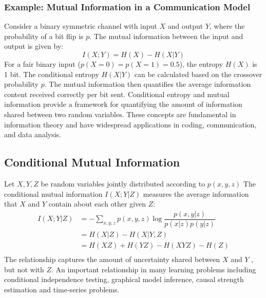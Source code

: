 \documentclass[12pt]{article}
\begin{document}
		\subsubsection*{Example: Mutual Information in a Communication Model}
		Consider a binary symmetric channel with input \(X\) and output \(Y\), where the probability of a bit flip is \(p\). The mutual information between the input and output is given by:
		\[ I(X; Y) = H(X) - H(X|Y) \]
		For a fair binary input (\(p(X=0) = p(X=1) = 0.5\)), the entropy \(H(X)\) is 1 bit. The conditional entropy \(H(X|Y)\) can be calculated based on the crossover probability \(p\). The mutual information then quantifies the average information content received correctly per bit sent. Conditional entropy and mutual information provide a framework for quantifying the amount of information shared between two random variables. These concepts are fundamental in information theory and have widespread applications in coding, communication, and data analysis.
		
		\subsection{Conditional Mutual Information}
		Let $X,Y,Z$ be random variables jointly distributed according to  $p(x,y,z)$ The conditional mutual information $I(X; Y |Z)$ measures the average information that $X$ and $Y$ contain about each other given $Z$:
		\begin{equation}
			\begin{split}
				I(X; Y |Z) & = - \sum_{x,y,z}  p(x,y,z) \log \dfrac{p(x,y|z)}{p(x|z)p(y|z)} \\
				& = H(X|Z) - H(X|Y,Z) \\
				& = H(X Z) + H(Y Z) - H(X Y Z) - H(Z) \\
			\end{split}
		\end{equation}
		The relationship captures the amount of uncertainty shared between $X$ and $Y$ , but not with $Z$. An important relationship in many learning problems including conditional independence testing, graphical model inference, causal strength estimation and time-series problems. 
		
		
\end{document}
